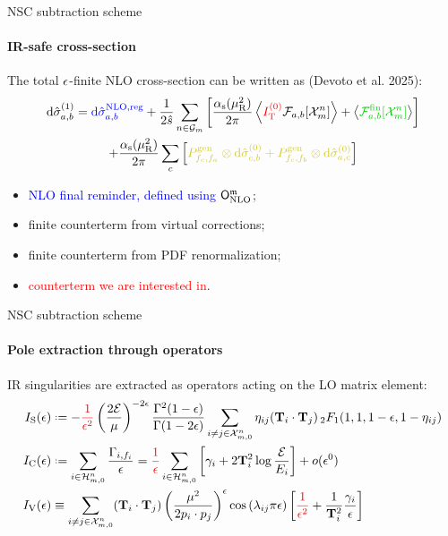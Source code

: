 
\begin{frame}[noframenumbering]{NSC subtraction scheme}
  \framesubtitle{IR-safe cross-section}

  The total $ \epsilon $-finite NLO cross-section can be written as (Devoto et al. 2025):
  \begin{multline*}
    \dd\pcs_{a,b}^{(1)} = \textcolor{blue}{\dd\pcs_{a,b}^\text{NLO,reg}} + \frac{1}{2\hat{s}} \sum_{n \in \en_m} \left[ \frac{\rcr}{2\pi} \ips{\textcolor{red}{\ito^{(0)}} \flm_{a,b}[\fs{n}{m}]} + \ips{\textcolor{green!80!black}{\flm_{a,b}^\text{fin}[\fs{n}{m}]}} \right] \\
    + \frac{\rcr}{2\pi} \sum_c \left[ \textcolor{yellow!80!black}{\fap_{f_c , f_a} \otimes \dd\pcs^{(0)}_{c,b} + \fap_{f_c , f_b} \otimes \dd\pcs^{(0)}_{a,c}} \right]
  \end{multline*}
  \begin{itemize}[<+->]
    \item \textcolor{blue}{NLO final reminder, defined using $ \mathsf{O}_\text{NLO}^{\mathfrak{m}} $};
    \item \textcolor{green!80!black}{finite counterterm from virtual corrections};
    \item \textcolor{yellow!80!black}{finite counterterm from PDF renormalization};
    \item \textcolor{red}{counterterm we are interested in}.
  \end{itemize}

\end{frame}


\begin{frame}{NSC subtraction scheme}
  \framesubtitle{Pole extraction through operators}

  IR singularities are extracted as operators acting on the LO matrix element:
  \begin{equation*}
    \begin{split}
      \iso(\de) & \defeq - \textcolor{red}{\frac{1}{\de^2}} \left( \frac{2\ema}{\mu} \right)^{-2\de} \frac{\Gamma^2(1-\de)}{\Gamma(1-2\de)} \sum_{i \neq j \in \fsp{n}{m}} \eta_{ij} (\cc) \,\hyp(1,1,1-\de,1-\eta_{ij}) \\
      \ico(\de) & \defeq \sum_{i \in \prt{n}{m}} \frac{\Gamma_{i,f_i}}{\de} = \textcolor{red}{\frac{1}{\de}} \sum_{i \in \prt{n}{m}} \left[ \gamma_i + 2 \tco_i^2 \log \frac{\ema}{E_i} \right] + \smo(\de^0) \\
      \ivo(\de) & \equiv \sum_{i \neq j \in \fsp{n}{m}} (\cc) \left( \frac{\mu^2}{2p_i \cdot p_j} \right)^\de \cos \left( \lambda_{ij} \pi \de \right) \left[ \textcolor{red}{\frac{1}{\de^2}} +  \frac{1}{\tco_i^2}\frac{\gamma_i}{\de} \right]
    \end{split}
  \end{equation*}

\end{frame}

